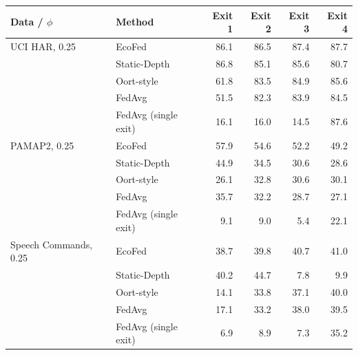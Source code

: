 \begin{tabular}{@{}llrrrr@{}}
\toprule
Data / $\phi$ & Method & Exit 1 & Exit 2 & Exit 3 & Exit 4\\
\midrule
UCI HAR, 0.25 & EcoFed & 86.1 & 86.5 & 87.4 & 87.7\\
 & Static-Depth & 86.8 & 85.1 & 85.6 & 80.7\\
 & Oort-style & 61.8 & 83.5 & 84.9 & 85.6\\
 & FedAvg & 51.5 & 82.3 & 83.9 & 84.5\\
 & FedAvg (single exit) & 16.1 & 16.0 & 14.5 & 87.6\\
\midrule
PAMAP2, 0.25 & EcoFed & 57.9 & 54.6 & 52.2 & 49.2\\
 & Static-Depth & 44.9 & 34.5 & 30.6 & 28.6\\
 & Oort-style & 26.1 & 32.8 & 30.6 & 30.1\\
 & FedAvg & 35.7 & 32.2 & 28.7 & 27.1\\
 & FedAvg (single exit) & 9.1 & 9.0 & 5.4 & 22.1\\
\midrule
Speech Commands, 0.25 & EcoFed & 38.7 & 39.8 & 40.7 & 41.0\\
 & Static-Depth & 40.2 & 44.7 & 7.8 & 9.9\\
 & Oort-style & 14.1 & 33.8 & 37.1 & 40.0\\
 & FedAvg & 17.1 & 33.2 & 38.0 & 39.5\\
 & FedAvg (single exit) & 6.9 & 8.9 & 7.3 & 35.2\\
\bottomrule
\end{tabular}